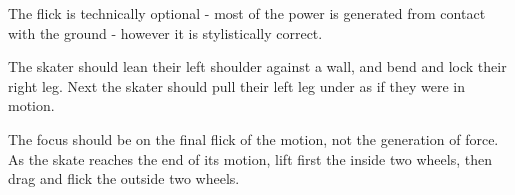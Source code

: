 The flick is technically optional - most of the power is generated from contact with the ground - however it is stylistically correct.  

The skater should lean their left shoulder against a wall, and bend and lock their right leg. 
Next the skater should pull their left leg under as if they were in motion.     

The focus should be on the final flick of the motion, not the generation of force.   
As the skate reaches the end of its motion, lift first the inside two wheels, then drag and flick the outside two wheels.     
